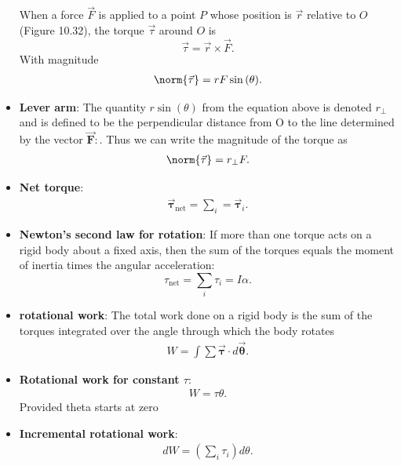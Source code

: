 \documentclass{report}
\begin{document}
\begin{itemize}
            \bigbreak \noindent 
            When a force $\vec{F}$ is applied to a point $P$ whose position is $\vec{r}$ relative to $O$ (Figure 10.32), the torque $\vec{\tau}$ around $O$ is
            \[
                \vec{\tau} = \vec{r} \times \vec{F}. 
            \]
            With magnitude 
            \begin{align*}
                \norm{\vec{\mathbf{\tau}}} = rF\sin{\left(\theta\right)}
            .\end{align*}
            \bigbreak \noindent 
    \item \textbf{Lever arm}: The quantity $r\sin{\left(\theta \right)}$ from the equation above is denoted $r_{\perp}$ and is defined to be the perpendicular distance from O to the line determined by the vector  $\vec{\mathbf{F}}: $. Thus we can write the magnitude of the torque as 
        \begin{align*}
            \norm{\vec{\mathbf{\tau}}} = r_{\perp} F
        .\end{align*}
    \item \textbf{Net torque}:
        \begin{align*}
            \vec{\mathbf{\tau}}_{\text{net}} = \sum_i = \vec{\mathbf{\tau}}_{i}
        .\end{align*}
    \item \textbf{Newton’s second law for rotation}:
        If more than one torque acts on a rigid body about a fixed axis, then the sum of the torques equals the moment of inertia times the angular acceleration:
        \[
            \tau_{\text{net}} = \sum_{i} \tau_{i} = I\alpha.
        \]
    \item \textbf{rotational work}: The total work done on a rigid body is the sum of the torques integrated over the angle through which the body rotates
        \begin{align*}
            W = \int \sum \vec{\mathbf{\tau}} \cdot d\vec{\mathbf{\theta }}
        .\end{align*}
    \item \textbf{Rotational work for constant $\tau$}:
        \begin{align*}
            W = \tau\theta
        .\end{align*}
        Provided theta starts at zero
    \item \textbf{Incremental rotational work}:
        \begin{align*}
            dW = \left(\sum_i \tau_{i}\right)d\theta 
        .\end{align*}

\end{itemize}
\end{document}
